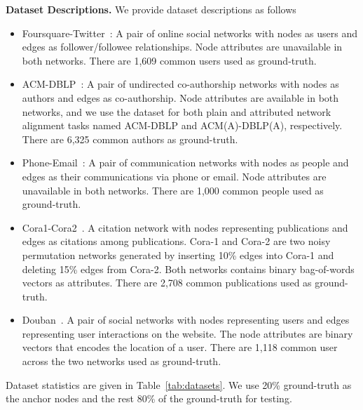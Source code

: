 \noindent\textbf{Dataset Descriptions.} 
We provide dataset descriptions as follows
\begin{itemize}
    \item Foursquare-Twitter~\cite{zhang2015integrated}: A pair of online social networks with nodes as users and edges as follower/followee relationships.
    Node attributes are unavailable in both networks. There are 1,609 common users used as ground-truth.
    \item ACM-DBLP~\cite{tang2008arnetminer}: A pair of undirected co-authorship networks with nodes as authors and edges as co-authorship. 
    Node attributes are available in both networks, and we use the dataset for both plain and attributed network alignment tasks named ACM-DBLP and ACM(A)-DBLP(A), respectively. There are 6,325 common authors as ground-truth.
    \item Phone-Email~\cite{zhang2017ineat}: A pair of communication networks with nodes as people and edges as their communications via phone or email.
    Node attributes are unavailable in both networks. There are 1,000 common people used as ground-truth.
    \item Cora1-Cora2~\cite{yang2016revisiting}. A citation network with nodes representing publications and edges as citations among publications. Cora-1 and Cora-2 are two noisy permutation networks generated by inserting 10\% edges into Cora-1 and deleting 15\% edges from Cora-2.
    Both networks contains binary bag-of-words vectors as attributes. There are 2,708 common publications used as ground-truth.
    \item Douban~\cite{final}. A pair of social networks with nodes representing users and edges representing user interactions on the website. 
    The node attributes are binary vectors that encodes the location of a user. There are 1,118 common user across the two networks used as ground-truth.
\end{itemize}
Dataset statistics are given in Table~\ref{tab:datasets}. We use 20\% ground-truth as the anchor nodes and the rest 80\% of the ground-truth for testing.

